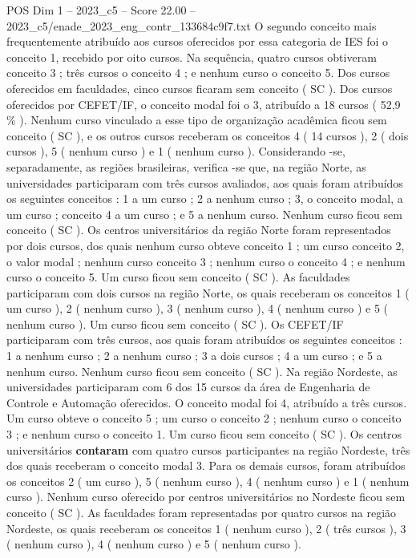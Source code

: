 \begin{textsample}{POS Dim 1 – 2023\_c5 – Score 22.00 – 2023\_c5/enade\_2023\_eng\_contr\_133684c9f7.txt}
O segundo conceito mais frequentemente atribuído aos cursos oferecidos por essa categoria de IES foi o conceito 1, recebido por oito cursos.
Na sequência, quatro cursos obtiveram conceito 3 ; três cursos o conceito 4 ; e nenhum curso o conceito 5.
Dos cursos oferecidos em faculdades, cinco cursos ficaram sem conceito ( SC ).
Dos cursos oferecidos por CEFET/IF, o conceito modal foi o 3, atribuído a 18 cursos ( 52,9 \% ).
Nenhum curso vinculado a esse tipo de organização acadêmica ficou sem conceito ( SC ), e os outros cursos receberam os conceitos 4 ( 14 cursos ), 2 ( dois cursos ), 5 ( nenhum curso ) e 1 ( nenhum curso ).
Considerando -se, separadamente, as regiões brasileiras, verifica -se que, na região Norte, as universidades participaram com três cursos avaliados, aos quais foram atribuídos os seguintes conceitos : 1 a um curso ; 2 a nenhum curso ; 3, o conceito modal, a um curso ; conceito 4 a um curso ; e 5 a nenhum curso.
Nenhum curso ficou sem conceito ( SC ).
Os centros universitários da região Norte foram representados por dois cursos, dos quais nenhum curso obteve conceito 1 ; um curso conceito 2, o valor modal ; nenhum curso conceito 3 ; nenhum curso o conceito 4 ; e nenhum curso o conceito 5.
Um curso ficou sem conceito ( SC ).
As faculdades participaram com dois cursos na região Norte, os quais receberam os conceitos 1 ( um curso ), 2 ( nenhum curso ), 3 ( nenhum curso ), 4 ( nenhum curso ) e 5 ( nenhum curso ).
Um curso ficou sem conceito ( SC ).
Os CEFET/IF participaram com três cursos, aos quais foram atribuídos os seguintes conceitos : 1 a nenhum curso ; 2 a nenhum curso ; 3 a dois cursos ; 4 a um curso ; e 5 a nenhum curso.
Nenhum curso ficou sem conceito ( SC ).
Na região Nordeste, as universidades participaram com 6 dos 15 cursos da área de Engenharia de Controle e Automação oferecidos.
O conceito modal foi 4, atribuído a três cursos.
Um curso obteve o conceito 5 ; um curso o conceito 2 ; nenhum curso o conceito 3 ; e nenhum curso o conceito 1.
Um curso ficou sem conceito ( SC ).
Os centros universitários \textbf{contaram} com quatro cursos participantes na região Nordeste, três dos quais receberam o conceito modal 3.
Para os demais cursos, foram atribuídos os conceitos 2 ( um curso ), 5 ( nenhum curso ), 4 ( nenhum curso ) e 1 ( nenhum curso ).
Nenhum curso oferecido por centros universitários no Nordeste ficou sem conceito ( SC ).
As faculdades foram representadas por quatro cursos na região Nordeste, os quais receberam os conceitos 1 ( nenhum curso ), 2 ( três cursos ), 3 ( nenhum curso ), 4 ( nenhum curso ) e 5 ( nenhum curso ).

\end{textsample}
